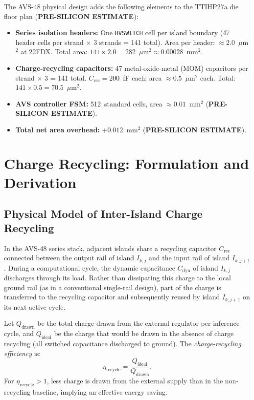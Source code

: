The AVS-48 physical design adds the following elements to the TTIHP27a
die floor plan (\textbf{PRE-SILICON ESTIMATE}):

\begin{itemize}
  \item \textbf{Series isolation headers:} One \texttt{HVSWITCH} cell
    per island boundary (47 header cells per strand $\times$ 3 strands
    = 141 total).  Area per header: $\approx 2.0$~$\mu$m$^2$ at 22FDX.
    Total area: $141 \times 2.0 = 282$~$\mu$m$^2 \approx 0.00028$~mm$^2$.
  \item \textbf{Charge-recycling capacitors:} 47 metal-oxide-metal
    (MOM) capacitors per strand $\times$ 3 = 141 total.
    $C_\mathrm{rec} = 200$~fF each; area $\approx 0.5$~$\mu$m$^2$ each.
    Total: $141 \times 0.5 = 70.5$~$\mu$m$^2$.
  \item \textbf{AVS controller FSM:} 512~standard cells, area
    $\approx 0.01$~mm$^2$ (\textbf{PRE-SILICON ESTIMATE}).
  \item \textbf{Total net area overhead:} $+0.012$~mm$^2$
    (\textbf{PRE-SILICON ESTIMATE}).
\end{itemize}

\section{Charge Recycling: Formulation and Derivation}
\label{sec:charge_recycling}

\subsection{Physical Model of Inter-Island Charge Recycling}

In the AVS-48 series stack, adjacent islands share a recycling
capacitor $C_\mathrm{rec}$ connected between the output rail of island
$I_{k,j}$ and the input rail of island $I_{k,j+1}$.  During a
computational cycle, the dynamic capacitance $C_\mathrm{dyn}$ of island
$I_{k,j}$ discharges through its load.  Rather than dissipating this
charge to the local ground rail (as in a conventional single-rail
design), part of the charge is transferred to the recycling capacitor
and subsequently reused by island $I_{k,j+1}$ on its next active cycle.

\begin{definition}
\label{def:charge_recycling_eff}
Let $Q_\mathrm{drawn}$ be the total charge drawn from the external
regulator per inference cycle, and $Q_\mathrm{ideal}$ be the charge
that would be drawn in the absence of charge recycling (all switched
capacitance discharged to ground).  The \emph{charge-recycling
efficiency} is:
\[
  \eta_\mathrm{recycle} = \frac{Q_\mathrm{ideal}}{Q_\mathrm{drawn}}.
\]
For $\eta_\mathrm{recycle} > 1$, less charge is drawn from the
external supply than in the non-recycling baseline, implying an
effective energy saving.
\end{definition}


